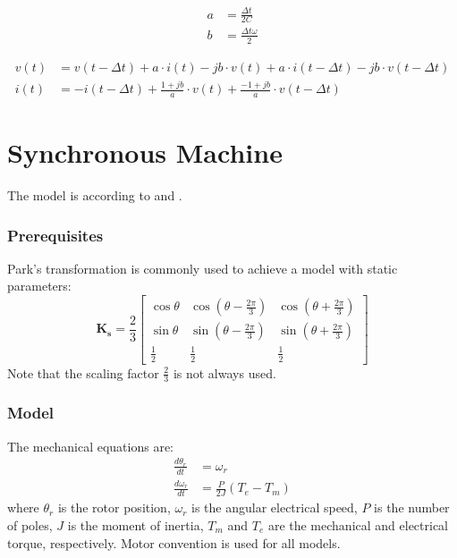 \begin{align}
        a &= \frac{\Delta t}{2C} \\
        b &= \frac{\Delta t \omega}{2}
\end{align}

\begin{align}
        v(t) &= v(t - \Delta t) + a \cdot i(t) - j b \cdot v(t) + a \cdot i(t - \Delta t) - j b \cdot v(t - \Delta t) \\
        i(t) &= -i(t- \Delta t) + \frac{1+jb}{a} \cdot v(t) + \frac{-1+jb}{a} \cdot v(t - \Delta t)
\end{align}

\section{Synchronous Machine}

The model is according to \cite{wang2010methods} and \cite{kundur1994power}. 

\subsubsection{Prerequisites}
Park's transformation is commonly used to achieve a model with static parameters:
%
\begin{equation}
\mathbf{K_s} = \frac{2}{3}
 \begin{bmatrix} 
  \cos \theta & \cos(\theta-\frac{2\pi}{3}) & \cos(\theta+\frac{2\pi}{3}) \\
  \sin \theta & \sin(\theta-\frac{2\pi}{3}) & \sin(\theta+\frac{2\pi}{3}) \\
  \frac{1}{2} & \frac{1}{2} & \frac{1}{2}
 \end{bmatrix}
\end{equation}
%
Note that the scaling factor $\frac{2}{3}$ is not always used. 

\subsubsection{Model}

The mechanical equations are:
%
\begin{align}
\frac{d\theta_r}{dt} &= \omega_r \\
\frac{d\omega_r}{dt} &= \frac{P}{2J} (T_e-T_m)
\end{align}
%
where $\theta_r$ is the rotor position, $\omega_r$ is the angular electrical speed, $P$ is the number of poles, $J$ is the moment of inertia, $T_m$ and $T_e$ are the mechanical and electrical torque, respectively. Motor convention is used for all models. 

